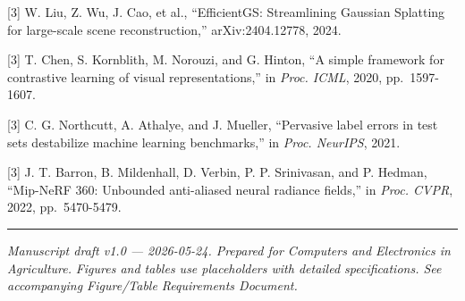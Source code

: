 \documentclass[11pt,a4paper]{article}
\begin{document}
{[}3{]} W. Liu, Z. Wu, J. Cao, et al., ``EfficientGS: Streamlining
Gaussian Splatting for large-scale scene reconstruction,''
arXiv:2404.12778, 2024.

{[}3{]} T. Chen, S. Kornblith, M. Norouzi, and G. Hinton, ``A simple
framework for contrastive learning of visual representations,'' in
\emph{Proc. ICML}, 2020, pp.~1597-1607.

{[}3{]} C. G. Northcutt, A. Athalye, and J. Mueller, ``Pervasive label
errors in test sets destabilize machine learning benchmarks,'' in
\emph{Proc. NeurIPS}, 2021.

{[}3{]} J. T. Barron, B. Mildenhall, D. Verbin, P. P. Srinivasan, and P.
Hedman, ``Mip-NeRF 360: Unbounded anti-aliased neural radiance fields,''
in \emph{Proc. CVPR}, 2022, pp.~5470-5479.

\begin{center}\rule{0.5\linewidth}{0.5pt}\end{center}

\emph{Manuscript draft v1.0 --- 2026-05-24. Prepared for Computers and
Electronics in Agriculture.} \emph{Figures and tables use placeholders
with detailed specifications. See accompanying Figure/Table Requirements
Document.}
\end{document}
